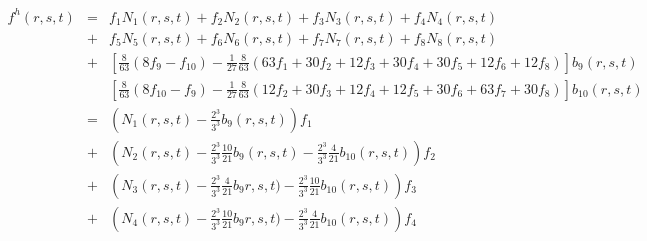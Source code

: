 \begin{eqnarray}
f^h(r,s,t) 
&=& f_1 N_1(r,s,t) + f_2 N_2(r,s,t) + f_3 N_3(r,s,t) + f_4 N_4(r,s,t) \nonumber\\
&+& f_5 N_5(r,s,t) + f_6 N_6(r,s,t) + f_7 N_7(r,s,t) +f_8 N_8(r,s,t) \nonumber\\
&+& \left[\frac{8}{63}(8{f}_{9}-{f}_{10})-\frac{1}{27}\frac{8}{63}  ( 63 f_1 +30 f_2 +12 f_3  +30f_4 +30f_5 +12f_6 +12f_8) \right] b_9(r,s,t) \nonumber\\
&&\left[ \frac{8}{63}(8 {f}_{10}-{f}_9)  -\frac{1}{27}\frac{8}{63} (12f_2 + 30f_3 + 12f_4 +12f_5 + 30f_6 + 63f_7 +30f_8) \right] b_{10}(r,s,t) \nonumber\\
&=& \left(N_1(r,s,t) - \frac{2^3}{3^3}b_9(r,s,t) \right) f_1 \nonumber\\
&+& \left(N_2(r,s,t) - \frac{2^3}{3^3}\frac{10}{21} b_9(r,s,t) - \frac{2^3}{3^3}\frac{4}{21} b_{10}(r,s,t)  \right) f_2 \nonumber\\
&+&\left( N_3(r,s,t)  -\frac{2^3}{3^3}\frac{4}{21} b_9r,s,t) -\frac{2^3}{3^3}\frac{10}{21} b_{10}(r,s,t)  \right)f_3 \nonumber\\
&+& \left( N_4(r,s,t) -\frac{2^3}{3^3}\frac{10}{21} b_{9}r,s,t) -\frac{2^3}{3^3}\frac{4}{21} b_{10}(r,s,t)\right)f_4 \nonumber\\ 

\end{eqnarray}
